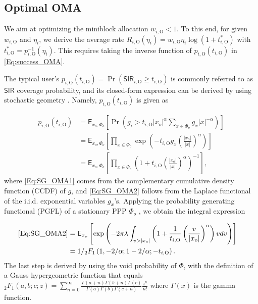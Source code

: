 \documentclass[conference]{IEEEtran}
\def\E{\mathsf{E}}
\def\SIR{\mathsf{SIR}}
\def\({\left(}
\def\){\right)}
\def\[{\left[}
\def\]{\right]}
\def\OMA{\text{O}}
\begin{document}
\subsection{Optimal OMA} \label{Sect:OptOMA}
We aim at optimizing the miniblock allocation $w_{i,\OMA} < 1$. To this end, for given $w_{i,\OMA}$ and $\eta_i$, we derive the average rate $R_{i,\OMA}(\eta_i)=w_{i,\OMA}\eta_i  \log(1 + t_{i,\OMA}^*)$ with $t_{i,\OMA}^*=p^{-1}_{i,\OMA}(\eta_i)$. This requires taking the inverse function of $p_{i,\OMA}(t_{i,\OMA})$ in \eqref{Eq:success_OMA}. 

The typical user's $p_{i,\OMA}(t_{i,\OMA})=\Pr(\SIR_{i,\OMA}\geq t_{i,\OMA})$ is commonly referred to as $\SIR$ coverage probability, and its closed-form expression can be derived by using stochastic geometry \cite{Andrews:2011bg,Haenggi:ISIT14}. Namely, $p_{i,\OMA}(t_{i,\OMA})$ is given as

\footnotesize\vspace{-10pt}\begin{align}
p_{i,\OMA}(t_{i,\OMA}) &= \E_{x_o,\Phi_o}\[\Pr\(g_i>  t_{i,\OMA} |x_o|^{\alpha} \sum_{x\in\Phi_o } g_{x} |x|^{-\alpha}\)\]\\
&= \E_{x_o,\Phi_o}\[\prod_{x\in\Phi_o }\exp\(-  t_{i,\OMA}  g_{x} \(\frac{|x_o|}{|x|}\)^\alpha \) \] \label{Eq:SG_OMA1}\\
&= \E_{x_o,\Phi_o}\[\prod_{x\in\Phi_o } \(1 + t_{i,\OMA} \(\frac{|x_o|}{|x|}\)^\alpha \)^{-1} \], \label{Eq:SG_OMA2}
\end{align}\normalsize
where \eqref{Eq:SG_OMA1} comes from the complementary cumulative density function (CCDF) of $g$, and \eqref{Eq:SG_OMA2} follows from the Laplace functional of the i.i.d. exponential variables $g_x$'s. Applying the probability generating functional (PGFL) of a stationary PPP $\Phi_o$ \cite{HaenggiSG}, we obtain the integral expression

\footnotesize\begin{align}
\hspace{-10pt}\eqref{Eq:SG_OMA2} &= \E_{x_o}\[ \exp\( -2 \pi \lambda\int_{v>|x_o|}\(1 + \frac{1}{t_{i,\OMA}}\(\frac{v}{|x_o|}\)^\alpha \)v dv  \)\]\\ 
&= 1/{}_2F_1\(1, -2/\alpha; 1-2/\alpha; -t_{i,\OMA}\). \label{Eq:SG_hypergeo}
\end{align}\normalsize
The last step is derived by using the void probability of $\Phi$, with the definition of a Gauss hypergeometric function that equals ${}_2F_1(a, b;c;z)=\sum_{n=0}^\infty \frac{\Gamma(a + n)\Gamma(b+n)\Gamma(c)}{\Gamma(a)\Gamma(b)\Gamma(c+n)} \frac{z^{n}}{n!}$ where $\Gamma(x)$ is the gamma function.
\end{document}
